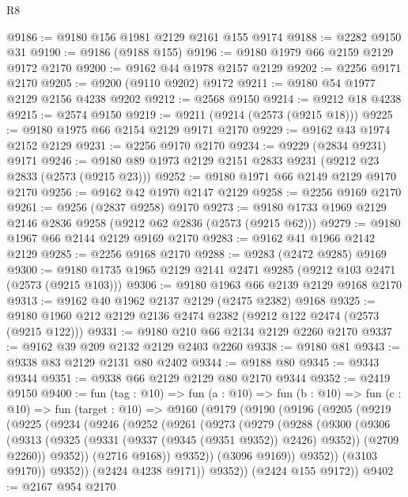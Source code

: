 \begin{lexlean}{R8}
\begin{coremodule}
@9186 := @9180 @156 @1981 @2129 @2161 @155 @9174
@9188 := @2282 @9150 @31
@9190 := @9186 (@9188 @155)
@9196 := @9180 @1979 @66 @2159 @2129 @9172 @2170
@9200 := @9162 @44 @1978 @2157 @2129
@9202 := @2256 @9171 @2170
@9205 := @9200 (@9110 @9202) @9172
@9211 := @9180 @54 @1977 @2129 @2156 @4238 @9202
@9212 := @2568 @9150
@9214 := @9212 @18 @4238
@9215 := @2574 @9150
@9219 := @9211 (@9214 (@2573 (@9215 @18)))
@9225 := @9180 @1975 @66 @2154 @2129 @9171 @2170
@9229 := @9162 @43 @1974 @2152 @2129
@9231 := @2256 @9170 @2170
@9234 := @9229 (@2834 @9231) @9171
@9246 := @9180 @89 @1973 @2129 @2151 @2833 @9231 (@9212 @23 @2833 (@2573 (@9215 @23)))
@9252 := @9180 @1971 @66 @2149 @2129 @9170 @2170
@9256 := @9162 @42 @1970 @2147 @2129
@9258 := @2256 @9169 @2170
@9261 := @9256 (@2837 @9258) @9170
@9273 := @9180 @1733 @1969 @2129 @2146 @2836 @9258 (@9212 @62 @2836 (@2573 (@9215 @62)))
@9279 := @9180 @1967 @66 @2144 @2129 @9169 @2170
@9283 := @9162 @41 @1966 @2142 @2129
@9285 := @2256 @9168 @2170
@9288 := @9283 (@2472 @9285) @9169
@9300 := @9180 @1735 @1965 @2129 @2141 @2471 @9285 (@9212 @103 @2471 (@2573 (@9215 @103)))
@9306 := @9180 @1963 @66 @2139 @2129 @9168 @2170
@9313 := @9162 @40 @1962 @2137 @2129 (@2475 @2382) @9168
@9325 := @9180 @1960 @212 @2129 @2136 @2474 @2382 (@9212 @122 @2474 (@2573 (@9215 @122)))
@9331 := @9180 @210 @66 @2134 @2129 @2260 @2170
@9337 := @9162 @39 @209 @2132 @2129 @2403 @2260
@9338 := @9180 @81
@9343 := @9338 @83 @2129 @2131 @80 @2402
@9344 := @9188 @80
@9345 := @9343 @9344
@9351 := @9338 @66 @2129 @2129 @80 @2170 @9344
@9352 := @2419 @9150
@9400 := fun (tag : @10) =>
  fun (a : @10) =>
  fun (b : @10) =>
  fun (c : @10) =>
  fun (target : @10) =>
  @9160
    (@9179
      (@9190
        (@9196
          (@9205
            (@9219
              (@9225
                (@9234
                  (@9246
                    (@9252
                      (@9261
                        (@9273
                          (@9279
                            (@9288
                              (@9300
                                (@9306
                                  (@9313
                                    (@9325 (@9331 (@9337 (@9345 (@9351 @9352)) @2426) @9352))
                                    (@2709 @2260))
                                  @9352))
                              (@2716 @9168))
                            @9352))
                        (@3096 @9169))
                      @9352))
                  (@3103 @9170))
                @9352))
            (@2424 @4238 @9171))
          @9352))
      (@2424 @155 @9172))
@9402 := @2167 @954 @2170

\end{coremodule}
\end{lexlean}
